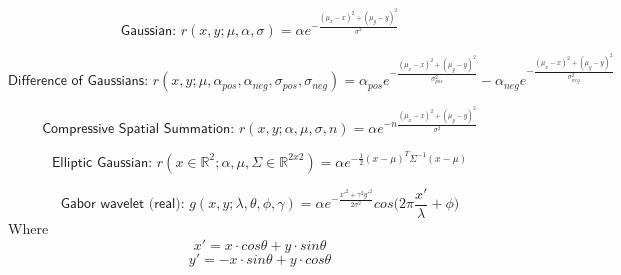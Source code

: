 \documentclass[10pt]{article}
\begin{document}
\newcommand\minus{\scalebox{0.75}[1.0]{\( - \)}}


$$ \textsf{Gaussian:   } r(x, y; \mu, \alpha, \sigma) = \alpha e^{-\frac{(\mu_{x}-x)^{2} + (\mu_{y}-y)^{2}}{\sigma^2}}$$

$$\textsf{Difference of Gaussians:   } r(x, y; \mu, \alpha_{pos}, \alpha_{neg}, \sigma_{pos}, \sigma_{neg}) = \alpha_{pos} e^{-\frac{(\mu_{x}-x)^{2} + (\mu_{y}-y)^{2}}{\sigma_{pos}^2}} - \alpha_{neg} e^{-\frac{(\mu_{x}-x)^{2} + (\mu_{y}-y)^{2}}{\sigma_{neg}^2}}$$

$$\textsf{Compressive Spatial Summation:   } r(x, y;\alpha, \mu, \sigma, n) = \alpha e^{-n \frac{(\mu_{x}-x)^{2} + (\mu_{y}-y)^{2}}{\sigma^2}}$$

$$\textsf{Elliptic Gaussian:   } r(x \in \mathbb{R}^2; \alpha, \mu, \Sigma \in \mathbb{R}^{2x2}) = \alpha e^{-\frac{1}{2}(x-\mu)^{T} \Sigma^{-1} (x-\mu)}$$

$$\textsf{Gabor wavelet (real):   } g(x,y;\lambda,\theta,\phi,\gamma) = \alpha e^{-\frac{x'^2+\gamma^2 y'^2}{2\sigma^2}} cos\bigg(2\pi\frac{x'}{\lambda} + \phi\bigg)$$
Where
$$  x' = x \cdot cos\theta + y \cdot sin\theta $$
$$  y' = -x \cdot sin\theta + y \cdot cos\theta $$
\end{document}
